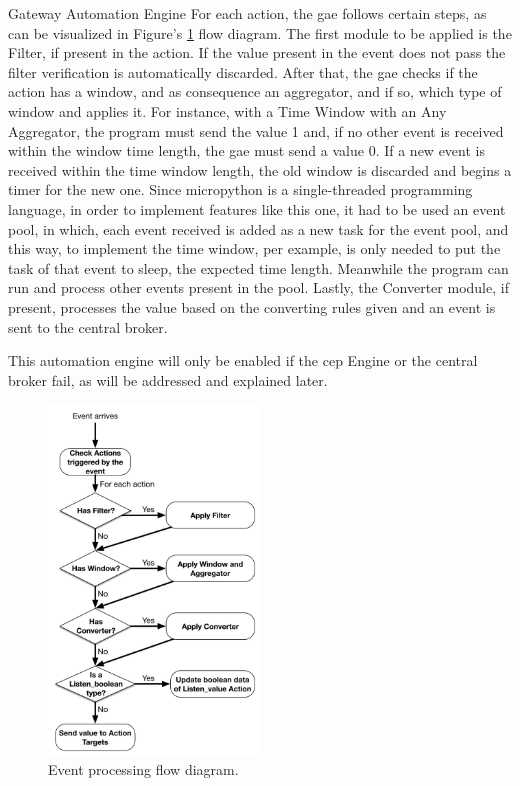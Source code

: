 \begin{Paragraph}{Gateway Automation Engine}
For each action, the \ac{gae} follows certain steps, as can be visualized in Figure's \ref{fig:action} flow diagram. The first module to be applied is the Filter, if present in the action. If the value present in the event does not pass the filter verification is automatically discarded. After that, the \ac{gae} checks if the action has a window, and as consequence an aggregator, and if so, which type of window and applies it. For instance, with a Time Window with an Any Aggregator, the program must send the value 1 and, if no other event is received within the window time length, the \ac{gae} must send a value 0. If a new event is received within the time window length, the old window is discarded and begins a timer for the new one. Since micropython is a single-threaded programming language, in order to implement features like this one, it had to be used an event pool, in which, each event received is added as a new task for the event pool, and this way, to implement the time window, per example, is only needed to put the task of that event to sleep, the expected time length. Meanwhile the program can run and process other events present in the pool. Lastly, the Converter module, if present, processes the value based on the converting rules given and an event is sent to the central broker. 

This automation engine will only be enabled if the \ac{cep} Engine or the central broker fail, as will be addressed and explained later.

\begin{figure}[]
	\centering
	\includegraphics[width=0.5\textwidth]{figures/action.png}
	\caption{Event processing flow diagram.}
	\label{fig:action}
\end{figure}

\end{Paragraph}

